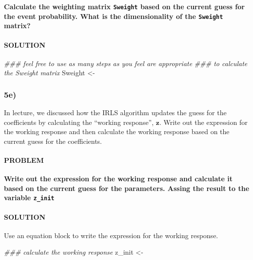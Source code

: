 \documentclass[
]{article}
\newenvironment{Shaded}{\begin{snugshade}}{\end{snugshade}}
\newcommand{\CommentTok}[1]{\textcolor[rgb]{0.56,0.35,0.01}{\textit{#1}}}
\newcommand{\NormalTok}[1]{#1}
\newcommand{\StringTok}[1]{\textcolor[rgb]{0.31,0.60,0.02}{#1}}
\begin{document}
\textbf{Calculate the weighting matrix \texttt{Sweight} based on the
current guess for the event probability. What is the dimensionality of
the \texttt{Sweight} matrix?}

\hypertarget{solution-25}{%
\paragraph{SOLUTION}\label{solution-25}}

\begin{Shaded}
\begin{Highlighting}[]
\CommentTok{### feel free to use as many steps as you feel are appropriate}
\CommentTok{### to calculate the Sweight matrix}
\NormalTok{Sweight <-}\StringTok{ }
\end{Highlighting}
\end{Shaded}

\hypertarget{e-4}{%
\subsubsection{5e)}\label{e-4}}

In lecture, we discussed how the IRLS algorithm updates the guess for
the coefficients by calculating the ``working response'',
\(\mathbf{z}\). Write out the expression for the working response and
then calculate the working response based on the current guess for the
coefficients.

\hypertarget{problem-27}{%
\paragraph{PROBLEM}\label{problem-27}}

\textbf{Write out the expression for the working response and calculate
it based on the current guess for the parameters. Assing the result to
the variable \texttt{z\_init}}

\hypertarget{solution-26}{%
\paragraph{SOLUTION}\label{solution-26}}

Use an equation block to write the expression for the working response.

\begin{Shaded}
\begin{Highlighting}[]
\CommentTok{### calculate the working response}
\NormalTok{z_init <-}\StringTok{ }
\end{Highlighting}
\end{Shaded}
\end{document}

